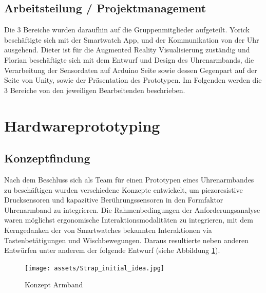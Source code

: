 \documentclass[11pt, a4paper]{article}
\begin{document}
\subsection{Arbeitsteilung / Projektmanagement}


Die 3 Bereiche wurden daraufhin auf die Gruppenmitglieder aufgeteilt. 
Yorick beschäftigte sich mit der Smartwatch App, und der Kommunikation von der Uhr ausgehend.
Dieter ist für die Augmented Reality Visualisierung zuständig und Florian beschäftigte sich mit dem Entwurf und Design des Uhrenarmbands, die Verarbeitung der Sensordaten auf Arduino Seite sowie dessen Gegenpart auf der Seite von Unity, sowie der Präsentation des Prototypen.
Im Folgenden werden die 3 Bereiche von den jeweiligen Bearbeitenden beschrieben.



\newpage


\section{Hardwareprototyping}
\label{sec:Hardwareprototyping}

\subsection{Konzeptfindung}
\label{sec:hw_proc_concept}

Nach dem Beschluss sich als Team für einen Prototypen eines Uhrenarmbandes zu beschäftigen wurden verschiedene Konzepte entwickelt, um piezoresistive Drucksensoren und kapazitive Berührungssensoren in den Formfaktor Uhrenarmband zu integrieren. 
Die Rahmenbedingungen der Anforderungsanalyse waren möglichst ergonomische Interaktionsmodalitäten zu integrieren, mit dem Kerngedanken der von Smartwatches bekannten Interaktionen via Tastenbetätigungen und Wischbewegungen. 
Daraus resultierte neben anderen Entwürfen unter anderem der folgende Entwurf (siehe Abbildung \ref{fig:Initial_Idea}).


\begin{figure}[h]
	\centering
	\texttt{[image: assets/Strap\_initial\_idea.jpg]}
	\caption{Konzept Armband}
	\label{fig:Initial_Idea}
\end{figure}
\end{document}
